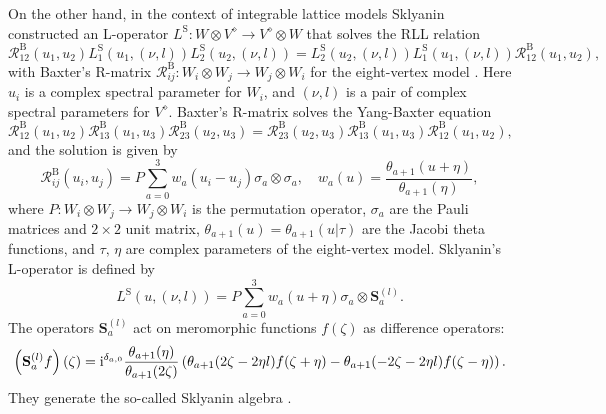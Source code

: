 On the other hand, in the context of integrable lattice models Sklyanin
constructed an L-operator $L^{\mathrm{S}}:W\otimes V^{\diamond}\rightarrow V^{\diamond}\otimes W$
that solves the RLL relation \cite{MR684124}
\begin{equation}
    \mathcal{R}_{12}^{\mathrm{B}}(u_{1},u_{2})
    L_{1}^{\mathrm{S}}(u_{1},(\nu,l))
    L_{2}^{\mathrm{S}}(u_{2},(\nu,l))
      =
          L_{2}^{\mathrm{S}}(u_{2},(\nu,l))
          L_{1}^{\mathrm{S}}(u_{1},(\nu,l))
          \mathcal{R}_{12}^{\mathrm{B}}(u_{1},u_{2}),
\end{equation}
with Baxter's R-matrix $\mathcal{R}_{ij}^{\mathrm{B}}:W_{i}\otimes W_{j}\rightarrow W_{j}\otimes W_{i}$
for the eight-vertex model \cite{Baxter:1971cr,Baxter:1972hz}. Here $u_{i}$
is a complex spectral parameter for $W_{i}$, and $(\nu,l)$
is a pair of complex spectral parameters for $V^{\diamond}$.
Baxter's R-matrix solves the Yang-Baxter equation
\begin{equation}
    \mathcal{R}_{12}^{\mathrm{B}}(u_{1},u_{2})
    \mathcal{R}_{13}^{\mathrm{B}}(u_{1},u_{3})
    \mathcal{R}_{23}^{\mathrm{B}}(u_{2},u_{3})
      =
        \mathcal{R}_{23}^{\mathrm{B}}(u_{2},u_{3})
        \mathcal{R}_{13}^{\mathrm{B}}(u_{1},u_{3})
        \mathcal{R}_{12}^{\mathrm{B}}(u_{1},u_{2}),
\end{equation}
and the solution is given by
\begin{equation}
    \mathcal{R}_{ij}^{\mathrm{B}}(u_{i},u_{j})
      =  P\sum_{a=0}^{3}w_{a}(u_{i}-u_{j})  \sigma_{a}  \otimes  \sigma_{a},
        \quad  w_{a}(u)  =  \frac{\theta_{a+1}(u+\eta)}{\theta_{a+1}(\eta)},
\end{equation}
where $P:W_{i}\otimes W_{j}\to W_{j}\otimes W_{i}$ is the
permutation operator, $\sigma_{a}$ are the Pauli matrices and $2\times2$
unit matrix, $\theta_{a+1}(u)=\theta_{a+1}(u|\tau)$ are the Jacobi
theta functions, and $\tau,\,\eta$ are complex parameters of the
eight-vertex model. Sklyanin's L-operator is defined by
\begin{equation}
    L^{\mathrm{S}}(u,(\nu,l))
      =  P\sum_{a=0}^{3}w_{a}(u+\eta)  \sigma_{a}  \otimes  \mathbf{S}_{a}^{(l)}.
\end{equation}
The operators $\mathbf{S}_{a}^{(l)}$ act on meromorphic functions
$f(\zeta)$ as difference operators:
\begin{equation}
    \left(\mathbf{S}_{a}^{(l)}f\right)(\zeta)
      = \mathrm{i}^{\delta_{a,0}}\frac{\theta_{a+1}(\eta)}{\theta_{a+1}(2\zeta)}
          \left(\theta_{a+1}(2\zeta-2\eta l)f(\zeta+\eta)-\theta_{a+1}(-2\zeta-2\eta l)f(\zeta-\eta)\right).
\end{equation}
They generate the so-called Sklyanin algebra \cite{MR725414}.

